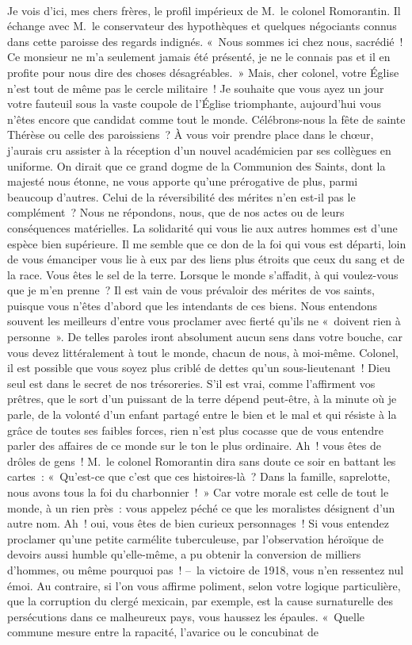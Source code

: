 \documentclass[french,twoside]{book} %
\begin{document}
\noindent  \par
Je vois d’ici, mes chers frères, le profil impérieux de M. le colonel Romorantin. Il échange avec M. le conservateur des hypothèques et quelques négociants connus dans cette paroisse des regards indignés. « Nous sommes ici chez nous, sacrédié ! Ce monsieur ne m’a seulement jamais été présenté, je ne le connais pas et il en profite pour nous dire des choses désagréables. » Mais, cher colonel, votre Église n’est tout de même pas le cercle militaire ! Je souhaite que vous ayez un jour votre fauteuil sous la vaste coupole de l’Église triomphante, aujourd’hui vous n’êtes encore que candidat comme tout le monde. Célébrons-nous la fête de sainte Thérèse ou celle des paroissiens ? À vous voir prendre place dans le chœur, j’aurais cru assister à la réception d’un nouvel académicien par ses collègues en uniforme. On dirait que ce grand dogme de la Communion des Saints, dont la majesté nous étonne, ne vous apporte qu’une prérogative de plus, parmi beaucoup d’autres. Celui de la réversibilité des mérites n’en est-il pas le complément ? Nous ne répondons, nous, que de nos actes ou de leurs conséquences matérielles. La solidarité qui vous lie aux autres hommes est d’une espèce bien supérieure. Il me semble que ce don de la foi qui vous est départi, loin de vous émanciper vous lie à eux par des liens plus étroits que ceux du sang et de la race. Vous êtes le sel de la terre. Lorsque le monde s’affadit, à qui voulez-vous que je m’en prenne ? Il est vain de vous prévaloir des mérites de vos saints, puisque vous n’êtes d’abord que les intendants de ces biens. Nous entendons souvent les meilleurs d’entre vous proclamer avec fierté qu’ils ne « doivent rien à personne ». De telles paroles iront absolument aucun sens dans votre bouche, car vous devez littéralement à tout le monde, chacun de nous, à moi-même. Colonel, il est possible que vous soyez plus criblé de dettes qu’un sous-lieutenant ! Dieu seul est dans le secret de nos trésoreries. S’il est vrai, comme l’affirment vos prêtres, que le sort d’un puissant de la terre dépend peut-être, à la minute où je parle, de la volonté d’un enfant partagé entre le bien et le mal et qui résiste à la grâce de toutes ses faibles forces, rien n’est plus cocasse que de vous entendre parler des affaires de ce monde sur le ton le plus ordinaire. Ah ! vous êtes de drôles de gens ! M. le colonel Romorantin dira sans doute ce soir en battant les cartes : « Qu’est-ce que c’est que ces histoires-là ? Dans la famille, saprelotte, nous avons tous la foi du charbonnier ! » Car votre morale est celle de tout le monde, à un rien près : vous appelez péché ce que les moralistes désignent d’un autre nom. Ah ! oui, vous êtes de bien curieux personnages ! Si vous entendez proclamer qu’une petite carmélite tuberculeuse, par l’observation héroïque de devoirs aussi humble qu’elle-même, a pu obtenir la conversion de milliers d’hommes, ou même pourquoi pas ! – la victoire de 1918, vous n’en ressentez nul émoi. Au contraire, si l’on vous affirme poliment, selon votre logique particulière, que la corruption du clergé mexicain, par exemple, est la cause surnaturelle des persécutions dans ce malheureux pays, vous haussez les épaules. « Quelle commune mesure entre la rapacité, l’avarice ou le concubinat de 
\end{document}
